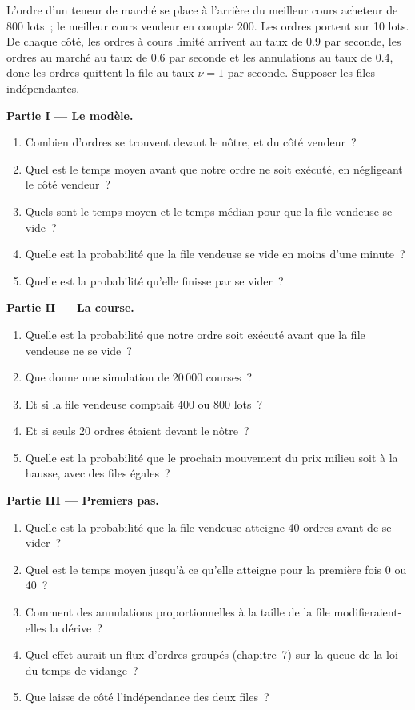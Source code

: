\begin{problem}\label{pb:qm:markov-chains-and-queues:1}
L'ordre d'un teneur de marché se place à l'arrière du meilleur cours acheteur de 800 lots~; le meilleur cours vendeur en compte 200. Les ordres portent sur 10 lots.
De chaque côté, les ordres à cours limité arrivent au taux de 0.9 par seconde, les ordres au marché au taux de 0.6 par seconde et les annulations au taux de
0.4, donc les ordres quittent la file au taux $\nu = 1$ par seconde. Supposer les files indépendantes.

\medskip\noindent\textbf{Partie I --- Le modèle.}
\begin{enumerate}
\item Combien d'ordres se trouvent devant le nôtre, et du côté vendeur~?
\item Quel est le temps moyen avant que notre ordre ne soit exécuté, en négligeant le côté vendeur~?
\item Quels sont le temps moyen et le temps médian pour que la file vendeuse se vide~?
\item Quelle est la probabilité que la file vendeuse se vide en moins d'une minute~?
\item Quelle est la probabilité qu'elle finisse par se vider~?
\end{enumerate}

\medskip\noindent\textbf{Partie II --- La course.}
\begin{enumerate}[resume]
\item Quelle est la probabilité que notre ordre soit exécuté avant que la file vendeuse ne se vide~?
\item Que donne une simulation de 20\,000 courses~?
\item Et si la file vendeuse comptait 400 ou 800 lots~?
\item Et si seuls 20 ordres étaient devant le nôtre~?
\item Quelle est la probabilité que le prochain mouvement du prix milieu soit à la hausse, avec des files égales~?
\end{enumerate}

\medskip\noindent\textbf{Partie III --- Premiers pas.}
\begin{enumerate}[resume]
\item Quelle est la probabilité que la file vendeuse atteigne 40 ordres avant de se vider~?
\item Quel est le temps moyen jusqu'à ce qu'elle atteigne pour la première fois 0 ou 40~?
\item Comment des annulations proportionnelles à la taille de la file modifieraient-elles la dérive~?
\item Quel effet aurait un flux d'ordres groupés (chapitre~7) sur la queue de la loi du temps de vidange~?
\item Que laisse de côté l'indépendance des deux files~?
\end{enumerate}


\end{problem}
